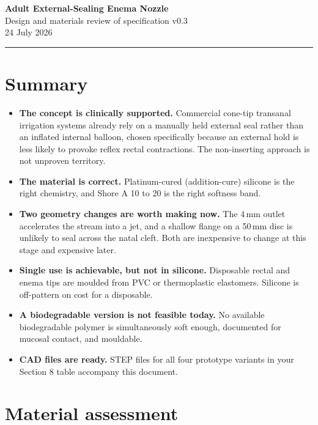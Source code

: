 \documentclass[11pt]{article}
\begin{document}
\begin{center}
  {\sffamily\LARGE\bfseries Adult External-Sealing Enema Nozzle}\\[0.35em]
  {\sffamily\large\color{slate} Design and materials review of specification v0.3}\\[0.9em]
  {\sffamily\footnotesize\color{slate} 24 July 2026}
\end{center}

\vspace{0.6em}
\noindent\textcolor{rule}{\rule{\linewidth}{0.8pt}}
\vspace{0.9em}

\section{Summary}

\begin{itemize}
  \item \textbf{The concept is clinically supported.} Commercial cone-tip transanal irrigation systems already rely on a manually held external seal rather than an inflated internal balloon, chosen specifically because an external hold is less likely to provoke reflex rectal contractions. The non-inserting approach is not unproven territory.
  \item \textbf{The material is correct.} Platinum-cured (addition-cure) silicone is the right chemistry, and Shore A 10 to 20 is the right softness band.
  \item \textbf{Two geometry changes are worth making now.} The 4\,mm outlet accelerates the stream into a jet, and a shallow flange on a 50\,mm disc is unlikely to seal across the natal cleft. Both are inexpensive to change at this stage and expensive later.
  \item \textbf{Single use is achievable, but not in silicone.} Disposable rectal and enema tips are moulded from PVC or thermoplastic elastomers. Silicone is off-pattern on cost for a disposable.
  \item \textbf{A biodegradable version is not feasible today.} No available biodegradable polymer is simultaneously soft enough, documented for mucosal contact, and mouldable.
  \item \textbf{CAD files are ready.} STEP files for all four prototype variants in your Section 8 table accompany this document.
\end{itemize}

\section{Material assessment}
\end{document}
